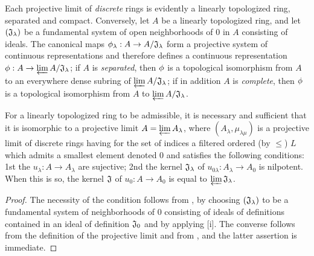 \begin{env}[7.2.1]
\label{0.7.2.1}
Each projective limit of {\em discrete} rings is evidently a linearly
topologized ring, separated and compact. Conversely, let $A$ be a linearly
topologized ring, and let $(\mathfrak{J}_\lambda)$ be a fundamental system of
open neighborhoods of $0$ in $A$ consisting of
ideals. The canonical maps $\phi_\lambda:A\to A/\mathfrak{J}_\lambda$ form
a projective system of continuous representations and therefore defines a
continuous representation $\phi:A\to\varprojlim A/\mathfrak{J}_\lambda$; if $A$
is {\em separated}, then $\phi$ is a topological isomorphism from $A$ to an
everywhere dense subring of $\varprojlim A/\mathfrak{J}_\lambda$; if in
addition $A$ is {\em complete}, then $\phi$ is a topological isomorphism from
$A$ to $\varprojlim A/\mathfrak{J}_\lambda$.
\end{env}

\begin{lem}[7.2.2]
\label{0.7.2.2}
For a linearly topologized ring to be admissible, it is necessary and sufficient
that it is isomorphic to a projective limit $A=\varprojlim A_\lambda$, where
$(A_\lambda,\mu_{\lambda\mu})$ is a projective limit of discrete rings having
for the set of indices a filtered ordered (by $\leqslant$) $L$ which admits
a smallest element denoted $0$ and satisfies the following conditions:
1st the $u_\lambda:A\to A_\lambda$ are sujective;
2nd the kernel $\mathfrak{J}_\lambda$ of
$u_{0\lambda}:A_\lambda\to A_0$ is nilpotent. When this is so, the kernel
$\mathfrak{J}$ of $u_0:A\to A_0$ is equal to $\varprojlim\mathfrak{J}_\lambda$.
\end{lem}

\begin{proof}
\label{proof-0.7.2.2}
The necessity of the condition follows from , by choosing
$(\mathfrak{J}_\lambda)$ to be a fundamental system of neighborhoods of $0$
consisting of ideals of definitions contained in an ideal of definition
$\mathfrak{J}_0$ and by applying [i]. The converse follows
from the definition of the projective limit and from , and the
latter assertion is immediate.
\end{proof}

